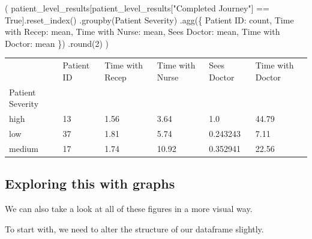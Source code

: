 \documentclass[
  letterpaper,
  DIV=11,
  numbers=noendperiod]{scrreprt}
\newenvironment{Shaded}{}{}
\newcommand{\BuiltInTok}[1]{\textcolor[rgb]{0.84,0.23,0.29}{#1}}
\newcommand{\DecValTok}[1]{\textcolor[rgb]{0.00,0.36,0.77}{#1}}
\newcommand{\NormalTok}[1]{\textcolor[rgb]{0.14,0.16,0.18}{#1}}
\newcommand{\OperatorTok}[1]{\textcolor[rgb]{0.14,0.16,0.18}{#1}}
\newcommand{\StringTok}[1]{\textcolor[rgb]{0.01,0.18,0.38}{#1}}
\newcommand{\VariableTok}[1]{\textcolor[rgb]{0.89,0.38,0.04}{#1}}
\begin{document}
\begin{Shaded}
\begin{Highlighting}[]
\NormalTok{(}
\NormalTok{    patient\_level\_results[patient\_level\_results[}\StringTok{"Completed Journey"}\NormalTok{] }\OperatorTok{==} \VariableTok{True}\NormalTok{].reset\_index()}
\NormalTok{    .groupby(}\StringTok{\textquotesingle{}Patient Severity\textquotesingle{}}\NormalTok{)}
\NormalTok{    .agg(\{}
        \StringTok{\textquotesingle{}Patient ID\textquotesingle{}}\NormalTok{: }\StringTok{\textquotesingle{}count\textquotesingle{}}\NormalTok{,}
        \StringTok{\textquotesingle{}Time with Recep\textquotesingle{}}\NormalTok{: }\StringTok{\textquotesingle{}mean\textquotesingle{}}\NormalTok{,}
        \StringTok{\textquotesingle{}Time with Nurse\textquotesingle{}}\NormalTok{: }\StringTok{\textquotesingle{}mean\textquotesingle{}}\NormalTok{,}
        \StringTok{\textquotesingle{}Sees Doctor\textquotesingle{}}\NormalTok{: }\StringTok{\textquotesingle{}mean\textquotesingle{}}\NormalTok{,}
        \StringTok{\textquotesingle{}Time with Doctor\textquotesingle{}}\NormalTok{: }\StringTok{\textquotesingle{}mean\textquotesingle{}}
\NormalTok{    \})}
\NormalTok{    .}\BuiltInTok{round}\NormalTok{(}\DecValTok{2}\NormalTok{)}
\NormalTok{)}
\end{Highlighting}
\end{Shaded}

\begin{longtable}[]{@{}llllll@{}}
\toprule\noalign{}
& Patient ID & Time with Recep & Time with Nurse & Sees Doctor & Time
with Doctor \\
Patient Severity & & & & & \\
\midrule\noalign{}
\endhead
\bottomrule\noalign{}
\endlastfoot
high & 13 & 1.56 & 3.64 & 1.0 & 44.79 \\
low & 37 & 1.81 & 5.74 & 0.243243 & 7.11 \\
medium & 17 & 1.74 & 10.92 & 0.352941 & 22.56 \\
\end{longtable}

\subsection{Exploring this with
graphs}\label{exploring-this-with-graphs}

We can also take a look at all of these figures in a more visual way.

To start with, we need to alter the structure of our dataframe slightly.
\end{document}
